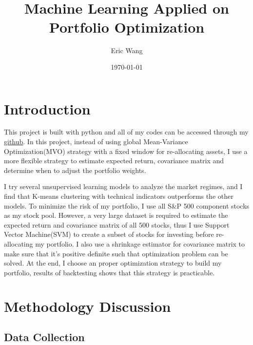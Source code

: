 \documentclass[a4paper,12pt]{article}
\title{Machine Learning Applied on Portfolio Optimization}
\author{Eric Wang}
\date{\today}
\begin{document}
\maketitle

\section{Introduction}

This project is built with python and all of my codes can be accessed through my \href{https://github.com/ywang408/ml_portfolio_optimization}{github}. In this project, instead of using global Mean-Variance Optimization(MVO) strategy with a fixed window for re-allocating assets, I use a more flexible strategy to estimate expected return, covariance matrix and determine when to adjust the portfolio weights.

I try several unsupervised learning models to analyze the market regimes, and I find that K-means clustering with technical indicators outperforms the other models. To minimize the risk of my portfolio, I use all S\&P 500 component stocks as my stock pool. However, a very large dataset is required to estimate the expected return and covariance matrix of all 500 stocks, thus I use Support Vector Machine(SVM) to create a subset of stocks for investing before re-allocating my portfolio. I also use a shrinkage estimator for covariance matrix to make sure that it's positive definite such that optimization problem can be solved. At the end, I choose an proper optimization strategy to build my portfolio, results of backtesting shows that this strategy is practicable.


\section{Methodology Discussion}\label{Methodology}

\subsection{Data Collection}
  
\end{document}
